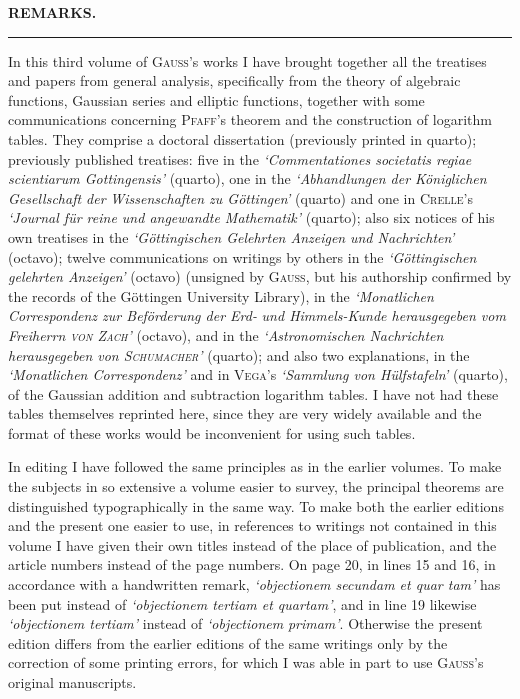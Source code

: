 \begingroup
\renewcommand{\arraystretch}{1.45}
\fancyhead[C]{}
\clearpage{}
\begin{center}\Large\textbf{REMARKS.}\end{center}
\begin{center}\rule{.09\textwidth}{.4pt}\end{center}

In this third volume of \textsc{Gauss}’s works I have brought together all the treatises and papers from general analysis, specifically from the theory of algebraic functions, Gaussian series and elliptic functions, together with some communications concerning \textsc{Pfaff}’s theorem and the construction of logarithm tables. They comprise a doctoral dissertation (previously printed in quarto); previously published treatises: five in the \textit{‘Commentationes societatis regiae scientiarum Gottingensis’} (quarto), one in the \textit{‘Abhandlungen der Königlichen Gesellschaft der}
\textit{Wissenschaften zu Göttingen’} (quarto) and one in \textsc{Crelle}’s \textit{‘Journal für reine und angewandte Mathematik’} (quarto); also six notices of his own treatises in the \textit{‘Göttingischen Gelehrten Anzeigen}
\textit{und Nachrichten’} (octavo); twelve communications on writings by others in the \textit{‘Göttingischen gelehrten Anzeigen’} (octavo) (unsigned by \textsc{Gauss}, but his authorship confirmed by the records of the Göttingen University Library), in the \textit{‘Monatlichen Correspondenz zur Beförderung der Erd-}
\textit{und Himmels-Kunde herausgegeben vom Freiherrn \textsc{von Zach}’} (octavo), and in the \textit{‘Astronomischen Nachrichten}
\textit{herausgegeben von \textsc{Schumacher}’} (quarto); and also two explanations, in the \textit{‘Monatlichen Correspondenz’} and in \textsc{Vega}’s \textit{‘Sammlung von Hülfstafeln’} (quarto), of the Gaussian addition and subtraction logarithm tables. I have not had these tables themselves reprinted here, since they are very widely available and the format of these works would be inconvenient for using such tables.

In editing I have followed the same principles as in the earlier volumes. To make the subjects in so extensive a volume easier to survey, the principal theorems are distinguished typographically in the same way. To make both the earlier editions and the present one easier to use, in references to writings not contained in this volume I have given their own titles instead of the place of publication, and the article numbers instead of the page numbers. On page 20, in lines 15 and 16, in accordance with a handwritten remark, \textit{‘objectionem secundam et quar%
tam’} has been put instead of \textit{‘objectionem tertiam et quartam’}, and in line 19 likewise \textit{‘objectionem tertiam’} instead of \textit{‘objectionem}
\textit{primam’}. Otherwise the present edition differs from the earlier editions of the same writings only by the correction of some printing errors, for which I was able in part to use \textsc{Gauss}’s original manuscripts.

